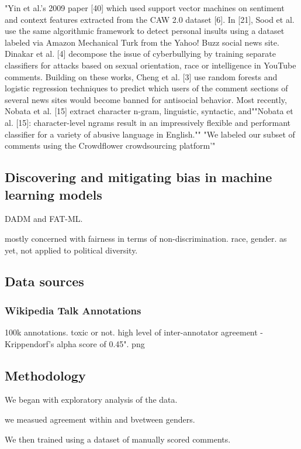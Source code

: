 \documentclass[sigconf]{acmart}
\begin{document}
"Yin et al.’s 2009 paper [40] which used support vector machines
on sentiment and context features extracted from the CAW
2.0 dataset [6]. In [21], Sood et al. use the same algorithmic framework
to detect personal insults using a dataset labeled via Amazon
Mechanical Turk from the Yahoo! Buzz social news site. Dinakar
et al. [4] decompose the issue of cyberbullying by training separate
classifiers for attacks based on sexual orientation, race or intelligence
in YouTube comments. Building on these works, Cheng et
al. [3] use random forests and logistic regression techniques to
predict which users of the comment sections of several news sites
would become banned for antisocial behavior. Most recently, Nobata
et al. [15] extract character n-gram, linguistic, syntactic, and""Nobata et al. [15]: character-level ngrams
result in an impressively flexible and performant classifier
for a variety of abusive language in English.""
"We labeled our subset of comments using the Crowdflower crowdsourcing
platform'"

\subsection{Discovering and mitigating bias in machine learning models}
DADM and FAT-ML.

mostly concerned with fairness in terms of non-discrimination. race, gender. as yet, not applied to political diversity.


\subsection{Data sources}

\subsubsection{Wikipedia Talk Annotations}
100k annotations. toxic or not. high level of inter-annotator agreement - Krippendorf’s alpha score of 0.45".
png

\subsection{Methodology}

We began with exploratory analysis of the data.

we measued agreement within and bvetween genders.

We then trained using a dataset of manually scored comments.
\end{document}
